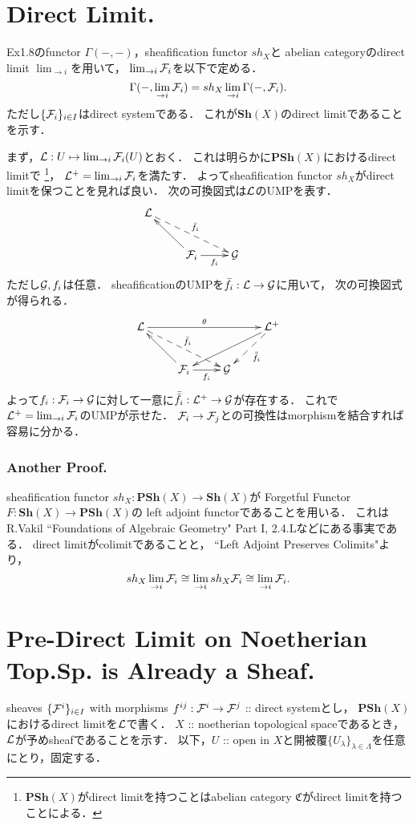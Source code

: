 \documentclass[a4paper]{jsarticle}
\newcommand{\Sh}{\mathbf{Sh}}
\newcommand{\PSh}{\mathbf{PSh}}
\begin{document}
\section{Direct Limit.} %
    Ex1.8のfunctor $\Gamma(-,-)$，sheafification functor $sh_X$と
    abelian categoryのdirect limit $\lim_{\to i}$を用いて，
    $\lim_{\to i}\mathcal{F}_i$を以下で定める．
    \[ \Gamma(-,\lim_{\to i}\mathcal{F}_i)=sh_X \lim_{\to i} \Gamma(-,\mathcal{F}_i). \]
    ただし$\{\mathcal{F}_i\}_{i \in I}$はdirect systemである．
    これが$\Sh(X)$のdirect limitであることを示す．

    まず，$\mathcal{L}: U \mapsto \lim_{\to i} \mathcal{F}_i(U)$とおく．
    これは明らかに$\PSh(X)$におけるdirect limitで
    \footnote{$\PSh(X)$がdirect limitを持つことはabelian category $\mathfrak{C}$がdirect limitを持つことによる．}，
    $\mathcal{L}^+=\lim_{\to i}\mathcal{F}_i$を満たす．
    よってsheafification functor $sh_X$がdirect limitを保つことを見れば良い．
    次の可換図式は$\mathcal{L}$のUMPを表す．
    \[
    \xymatrix
    {
        \shL \ar@{-->}[rrd]^-{\bar{f}_i}& {} & {} & {} \\
        {} & \shF_i \ar[r]_-{f_i} \ar[lu] & \shG & {}
    }
    \]
    ただし$\mathcal{G}, f_i$は任意．
    sheafificationのUMPを$\bar{f}_i: \mathcal{L} \to \mathcal{G}$に用いて，
    次の可換図式が得られる．
    \[
    \xymatrix
    {
    \shL \ar@{-->}[rrd]^-{\bar{f}_i} \ar[rrr]^-{\theta}& {} & {} & \shL^+ \ar[lld] \ar@{-->}[ld]^-{\bar{\bar{f}}_i}\\
        {} & \shF_i \ar[r]_-{f_i} \ar[lu] & \shG & {}
    }
    \]
    よって$f_i:\mathcal{F}_i \to \mathcal{G}$に対して一意に$\bar{\bar{f}}_i: \mathcal{L}^+ \to \mathcal{G}$が存在する．
    これで$\mathcal{L}^+=\lim_{\to i}\mathcal{F}_i$のUMPが示せた．
    $\mathcal{F}_i \to \mathcal{F}_j$との可換性はmorphismを結合すれば容易に分かる．

    \subsubsection{Another Proof.} \label{sssec:1-10-1}
    sheafification functor $sh_X: \PSh(X) \to \Sh(X)$が
    Forgetful Functor $F: \Sh(X) \to \PSh(X)$の
    left adjoint functorであることを用いる．
    これはR.Vakil ``Foundations of Algebraic Geometry" Part I, 2.4.Lなどにある事実である．
    direct limitがcolimitであることと，
    ``Left Adjoint Preserves Colimits"より，
    \[ sh_X \lim_{\to i} \mathcal{F}_i \cong \lim_{\to i} sh_X \mathcal{F}_i \cong \lim_{\to i} \mathcal{F}_i. \]

\section{Pre-Direct Limit on Noetherian Top.Sp. is Already a Sheaf.} %
sheaves $\{\mathcal{F}^i\}_{i \in I}$ with morphisms $f^{ij}: \mathcal{F}^i \to \mathcal{F}^j$ :: direct systemとし，
    $\PSh(X)$におけるdirect limitを$\mathcal{L}$で書く．
    $X$ :: noetherian topological spaceであるとき，$\mathcal{L}$が予めsheafであることを示す．
    以下，$U$ :: open in $X$と開被覆$\{U_{\lambda}\}_{\lambda \in \Lambda}$を任意にとり，固定する．
\end{document}
